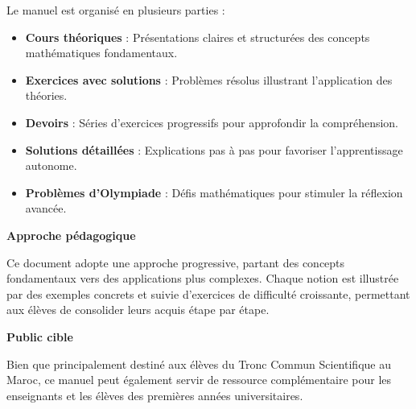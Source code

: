 \documentclass[11pt,%
	fleqn,%
	a4paper,%
	twoside%
]{backagBook}
\begin{document}
\vspace{0.3cm}

Le manuel est organisé en plusieurs parties :
\begin{itemize}
    \item \textbf{Cours théoriques} : Présentations claires et structurées des concepts mathématiques fondamentaux.
    \item \textbf{Exercices avec solutions} : Problèmes résolus illustrant l'application des théories.
    \item \textbf{Devoirs} : Séries d'exercices progressifs pour approfondir la compréhension.
    \item \textbf{Solutions détaillées} : Explications pas à pas pour favoriser l'apprentissage autonome.
    \item \textbf{Problèmes d'Olympiade} : Défis mathématiques pour stimuler la réflexion avancée.
\end{itemize}

\vspace{0.5cm}

\textbf{Approche pédagogique}

\vspace{0.3cm}
Ce document adopte une approche progressive, partant des concepts fondamentaux vers des applications plus complexes. Chaque notion est illustrée par des exemples concrets et suivie d'exercices de difficulté croissante, permettant aux élèves de consolider leurs acquis étape par étape.

\vspace{0.5cm}

\textbf{Public cible}

\vspace{0.3cm}

Bien que principalement destiné aux élèves du Tronc Commun Scientifique au Maroc, ce manuel peut également servir de ressource complémentaire pour les enseignants et les élèves des premières années universitaires.


\pagestyle{empty} %

\tableofcontents %

\pagestyle{fancy} %
\end{document}
